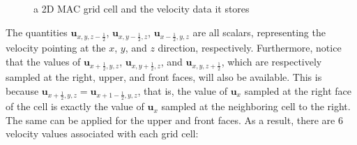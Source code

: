 \begin{figure}[!h]
\begin{tikzpicture}
        




        
         \end{tikzpicture}
    
    \caption{a 2D MAC grid cell and the velocity data it stores}
    \label{mac cell 1}
\end{figure}


The quantities $\textbf{u}_{x,y,z-\frac{1}{2}}$, $\textbf{u}_{x,y-\frac{1}{2},z}$, $\textbf{u}_{x-\frac{1}{2},y,z}$ are all scalars, representing the velocity pointing at the $x$, $y$, and $z$ direction, respectively. Furthermore, notice that the values of $\textbf{u}_{x+\frac{1}{2},y,z}$, $\textbf{u}_{x,y+\frac{1}{2},z}$, and $\textbf{u}_{x,y,z+\frac{1}{2}}$, which are respectively sampled at the right, upper, and front faces, will also be available. This is because $\textbf{u}_{x+\frac{1}{2},y,z} = \textbf{u}_{x+1-\frac{1}{2},y,z}$, that is, the value of $\textbf{u}_x$ sampled at the right face of the cell is exactly the value of $\textbf{u}_x$ sampled at the neighboring cell to the right. The same can be applied for the upper and front faces. As a result, there are 6 velocity values associated with each grid cell:

